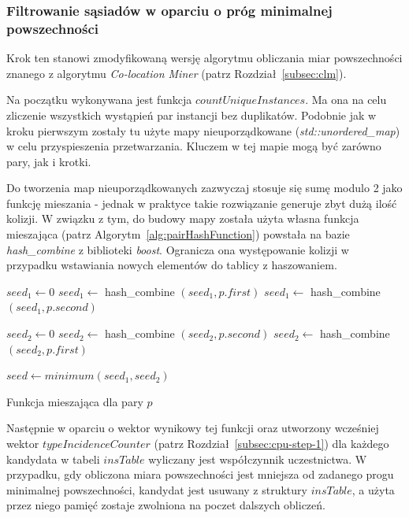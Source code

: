\documentclass[12pt]{article}
\begin{document}
\subsubsection{Filtrowanie sąsiadów w oparciu o próg minimalnej powszechności}

Krok ten stanowi zmodyfikowaną wersję algorytmu obliczania miar powszechności znanego z algorytmu \textit{Co-location Miner} (patrz Rozdział~\ref{subsec:clm}).

Na początku wykonywana jest funkcja $ countUniqueInstances$. Ma ona na celu zliczenie wszystkich wystąpień par instancji bez duplikatów. Podobnie jak w kroku pierwszym zostały tu użyte mapy nieuporządkowane (\textit{std::unordered\_map}) w celu przyspieszenia przetwarzania.
Kluczem w tej mapie mogą być zarówno pary, jak i krotki.

Do tworzenia map nieuporządkowanych zazwyczaj stosuje się sumę modulo 2 jako funkcję mieszania - jednak w praktyce takie rozwiązanie generuje zbyt dużą ilość kolizji. W związku z tym, do budowy mapy została użyta własna funkcja mieszająca (patrz Algorytm~\ref{alg:pairHashFunction}) powstała na bazie \textit{hash\_combine} z biblioteki \textit{boost}. Ogranicza ona występowanie kolizji w przypadku wstawiania nowych elementów do tablicy z haszowaniem. 

\begin{algorithm}
$ seed_1 \leftarrow 0 $\;
$ seed_1 \leftarrow $ hash\_combine $(seed_1, p.first) $\;
$ seed_1 \leftarrow $ hash\_combine $(seed_1, p.second) $\;

$ seed_2 \leftarrow 0 $\;
$ seed_2 \leftarrow $ hash\_combine $(seed_2, p.second) $\;
$ seed_2 \leftarrow $ hash\_combine $(seed_2, p.first) $\;

$ seed \leftarrow minimum(seed_1, seed_2) $\;

\caption{Funkcja mieszająca dla pary $p$}
\label{alg:pairHashFunction}
\end{algorithm}

Następnie w oparciu o wektor wynikowy tej funkcji oraz utworzony wcześniej wektor $ typeIncidenceCounter$ (patrz Rozdział~\ref{subsec:cpu-step-1}) dla każdego kandydata w tabeli $ insTable $ wyliczany jest współczynnik uczestnictwa. W przypadku, gdy obliczona miara powszechności jest mniejsza od zadanego progu minimalnej powszechności, kandydat jest usuwany z struktury $ insTable $, a użyta przez niego pamięć zostaje zwolniona na poczet dalszych obliczeń.
\end{document}
